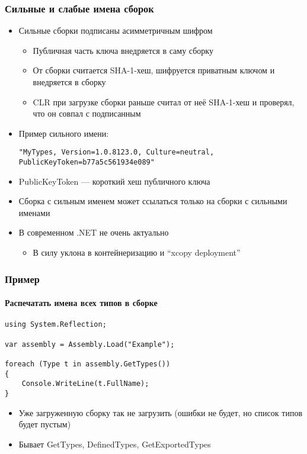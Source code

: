 \documentclass{../../slides-style}
\begin{document}
    \begin{frame}[fragile]
        \frametitle{Сильные и слабые имена сборок}
        \begin{itemize}
            \item Сильные сборки подписаны асимметричным шифром
            \begin{itemize}
                \item Публичная часть ключа внедряется в саму сборку
                \item От сборки считается SHA-1-хеш, шифруется приватным ключом и внедряется в сборку
                \item CLR при загрузке сборки раньше считал от неё SHA-1-хеш и проверял, что он совпал с подписанным
            \end{itemize}
            \item Пример сильного имени:
            \begin{scriptsize}
                \begin{verbatim}
"MyTypes, Version=1.0.8123.0, Culture=neutral, PublicKeyToken=b77a5c561934e089"
                \end{verbatim}
            \end{scriptsize}
            \item PublicKeyToken --- короткий хеш публичного ключа
            \item Сборка с сильным именем может ссылаться только на сборки с сильными именами
            \item В современном .NET не очень актуально
            \begin{itemize}
                \item В силу уклона в контейнеризацию и \enquote{xcopy deployment}
            \end{itemize}
        \end{itemize}
    \end{frame}

    \begin{frame}[fragile]
        \frametitle{Пример}
        \framesubtitle{Распечатать имена всех типов в сборке}
        \begin{verbatim}
using System.Reflection;

var assembly = Assembly.Load("Example");

foreach (Type t in assembly.GetTypes())
{
    Console.WriteLine(t.FullName);
}
        \end{verbatim}
        \begin{itemize}
            \item Уже загруженную сборку так не загрузить (ошибки не будет, но список типов будет пустым)
            \item Бывает GetTypes, DefinedTypes, GetExportedTypes
        \end{itemize}
    \end{frame}
\end{document}
